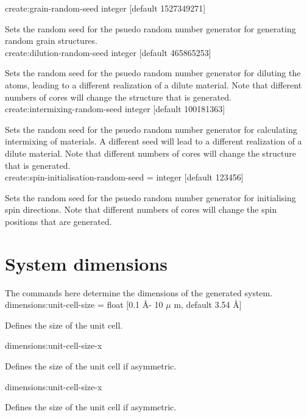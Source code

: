 {\zicf create:grain-random-seed integer [default 1527349271]}
Sets the random seed for the psuedo random number generator for generating random
grain structures. \\

{\zicf create:dilution-random-seed integer [default 465865253]}
Sets the random seed for the psuedo random number generator for diluting the
atoms, leading to a different realization of a dilute material. Note that
different numbers of cores will change the structure that is generated.\\

{\zicf create:intermixing-random-seed integer [default 100181363]}
Sets the random seed for the psuedo random number generator for calculating
intermixing of materials. A different seed will lead to a different realization
of a dilute material. Note that different numbers of cores will change the
structure that is generated.\\

{\zicf create:spin-initialisation-random-seed = integer [default 123456]}
Sets the random seed for the psuedo random number generator for initialising
spin directions. Note that different numbers of cores will change the
spin positions that are generated.\\

\section*{System dimensions}
The commands here determine the dimensions of the generated system.\\

{\zicf dimensions:unit-cell-size = float [0.1 \AA - 10 $\mu$ m, default 3.54 \AA]} Defines the size of the unit cell.\\ \par

{\zicf dimensions:unit-cell-size-x} Defines the size of the unit cell if asymmetric.\\ \par

{\zicf dimensions:unit-cell-size-x} Defines the size of the unit cell if asymmetric.\\ \par

